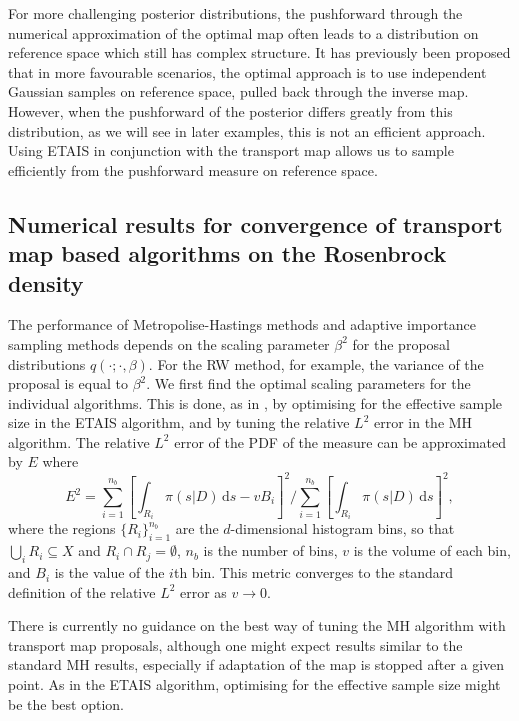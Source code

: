 \documentclass[final]{siamltex}
\newcommand{\edit}[1]{{\color{red} #1}}
\begin{document}
\edit{For more challenging posterior distributions, the pushforward
  through the numerical
approximation of the optimal map often leads to a distribution on
reference space which still has complex structure. It has previously
been proposed that in more favourable scenarios, the optimal approach
is to use independent Gaussian samples on reference space, pulled back
through the inverse map. However, when the pushforward of the
posterior differs greatly from this distribution, as we will see in
later examples, this is not an
efficient approach. Using ETAIS in conjunction with the transport map
allows us to sample efficiently from the pushforward measure on
reference space.}

\subsection[Numerical results]{Numerical results for convergence of
  transport map based algorithms on the Rosenbrock density}
\edit{The performance of Metropolise-Hastings methods and adaptive
importance sampling methods depends on the scaling parameter
$\beta^2$ for the proposal distributions $q(\cdot ;
\cdot, \beta)$. For the RW method, for example, the variance of the
proposal is equal to $\beta^2$.}
We first find the optimal scaling parameters for the individual
algorithms. This is done, as in \cite{cotter2015parallel}, by optimising for the effective sample size in
the ETAIS algorithm, and by tuning the relative $L^2$ error in the MH
algorithm. 
\edit{The relative $L^2$ error of the PDF of the measure can be
  approximated by $E$ where
\begin{equation}\label{eqn:L2_error}
	E^2 = \sum\limits_{i=1}^{n_b}\left[\displaystyle\int_{R_i} \! \pi(s|D) \, \mbox{d}s - vB_i\right]^2 \Big/ \sum\limits_{i=1}^{n_b}\left[\displaystyle\int_{R_i} \! \pi(s|D) \, \mbox{d}s\right]^2,
\end{equation}
where the regions $\{R_i\}_{i=1}^{n_b}$ are the $d$-dimensional
histogram bins, so that $\bigcup_i R_i \subseteq X$ and
$R_i\cap R_j=\emptyset$, $n_b$ is the number of bins, $v$ is the
volume of each bin, and $B_i$ is the value of the $i$th bin. This
metric converges to the standard definition of the relative $L^2$
error as $v\rightarrow 0$.}

There is currently no
guidance on the best way of tuning the MH algorithm with transport map
proposals, although one might expect results similar to the standard MH
results, especially if adaptation of the map is stopped after a given
point. As in the ETAIS algorithm, optimising for the effective sample size might be the best option.
\end{document}
